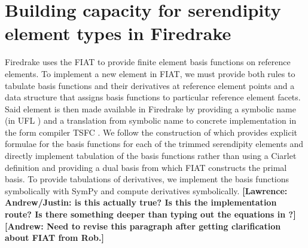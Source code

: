 \documentclass[format=acmsmall,screen,timestamp=false,a4paper]{acmart}
\DeclareMathOperator{\Div}{div}
\DeclareMathOperator{\curl}{curl}
\newcommand\akg[1]{\textbf{\textcolor[rgb]{.5,0,1}{[Andrew: #1]}}}
\newcommand\lm[1]{\textbf{\textcolor[rgb]{1,0,0.5}{[Lawrence: #1]}}}
\newcommand{\hcurl}{\ensuremath{{H}(\curl)}\xspace}
\newcommand{\hdiv}{\ensuremath{{H}(\Div)}\xspace}
\begin{document}
  
  
  \section{Building capacity for serendipity element types in Firedrake}
  \label{sec:buildcap}

  Firedrake uses the FIAT \cite{kirby2004algorithm,kirby2012fiat} to provide finite element basis functions on reference elements. 
  To implement a new element in FIAT, we must provide both rules to tabulate basis functions and their derivatives at reference element points and a data structure that assigns basis functions to particular reference element facets.
  Said element is then made available in Firedrake by providing a symbolic name (in UFL \cite{alnaes2014unified}) and a translation from symbolic name to concrete implementation in the form compiler TSFC \cite{homolya2018tsfc}. We follow the construction of \cite{gillette2019computational} which provides explicit formulae for the basis functions for each of the trimmed serendipity elements and directly implement tabulation of the basis functions rather than using a Ciarlet definition and providing a dual basis from which FIAT constructs the primal basis. To provide tabulations of derivatives, we implement the basis functions symbolically with SymPy \cite{sympy2017} and compute derivatives symbolically. \lm{Andrew/Justin: is this actually true? Is this the implementation route? Is there something deeper than typing out the equations in \cite{gillette2019computational}?}\akg{Need to revise this paragraph after getting clarification about FIAT from Rob.}
  
\end{document}
